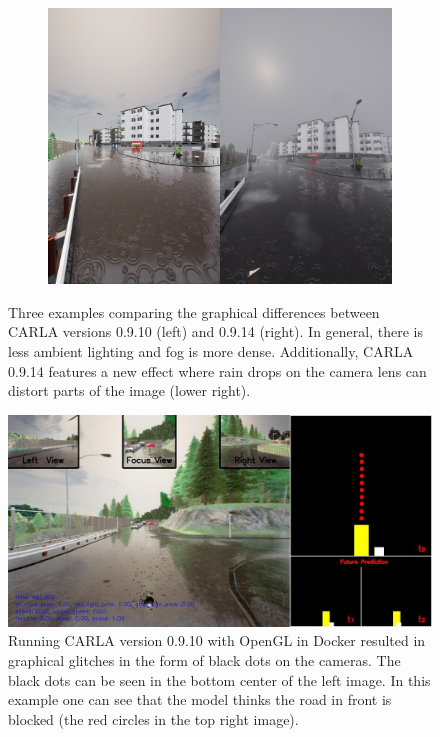 \begin{figure}[htbp]
    \begin{subfigure}[b]{0.6\textwidth}
        \centering
        \includegraphics[width=\textwidth]{chapters/2-background/figures/10-vs-14-3.jpeg}
        \label{fig:10-vs-14-3}
    \end{subfigure}
    
    \caption{Three examples comparing the graphical differences between CARLA versions 0.9.10 (left) and 0.9.14 (right).
    In general, there is less ambient lighting and fog is more dense.
    Additionally, CARLA 0.9.14 features a new effect where rain drops on the camera lens can distort parts of the image (lower right).
    }
    \label{fig:10-vs-14}
\end{figure}

\begin{figure}[htbp]
    \centering
    \includegraphics[width=\textwidth]{chapters/2-background/figures/black-dots.jpg}
    \caption{Running CARLA version 0.9.10 with OpenGL in Docker resulted in graphical glitches in the form of black dots on the cameras. The black dots can be seen in the bottom center of the left image. In this example one can see that the model thinks the road in front is blocked (the red circles in the top right image).}
    \label{fig:black dots}
\end{figure}